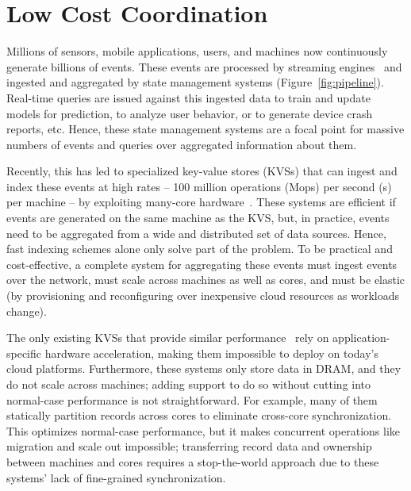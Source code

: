 \chapter{Low Cost Coordination}

Millions of sensors, mobile applications, users, and machines now
continuously generate billions of events.
%
These events are processed by streaming
engines~\cite{spark-streaming, trill} and ingested and aggregated
by state management systems (Figure~\ref{fig:pipeline}).
%
Real-time queries are issued against this ingested data to train and
update models for prediction, to analyze user behavior, or to generate
device crash reports, etc.
%
Hence, these state management systems are a focal point for massive numbers of
events and queries over aggregated information about them.



Recently, this has led to specialized key-value stores (KVSs) that can
ingest and index these events at high rates -- 100 million operations
(Mops) per second (s) per machine -- by
exploiting many-core hardware~\cite{faster,anna}.
%
These systems are efficient if events are generated on the same machine as
the KVS, but, in practice, events need to be aggregated from a wide
and distributed set of data sources.
%
Hence, fast indexing schemes alone only solve part of the problem.
%
To be practical and cost-effective, a complete system for aggregating these
events must ingest events over the network, must scale across machines as
well as cores, and must be elastic (by provisioning and reconfiguring over
inexpensive cloud resources as workloads change).

The only existing KVSs that provide similar
performance~\cite{mica,flexnic,floem,kvdirect} rely on application-specific
hardware acceleration, making them impossible to deploy on today's cloud
platforms.
%
Furthermore, these systems only store data in DRAM, and they do not scale across
machines; adding support to do so without cutting into normal-case performance
is not straightforward.
%
For example, many of them statically partition records across cores to
eliminate cross-core synchronization.
%
This optimizes normal-case performance, but it makes concurrent
operations like migration and scale out impossible; transferring record data
and ownership between machines and cores requires a stop-the-world approach
due to these systems' lack of fine-grained synchronization.

